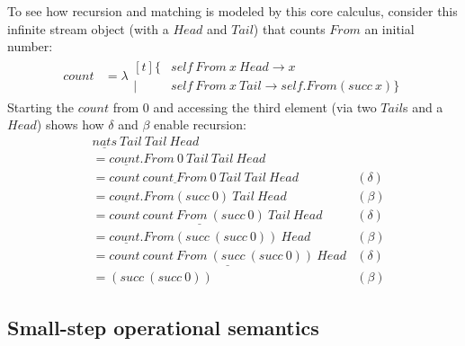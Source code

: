 \documentclass[sigplan,screen]{acmart}
\begin{document}
\begin{example}
\label{ex:count}
  
To see how recursion and matching is modeled by this core calculus, consider
this infinite stream object (with a $\mathit{Head}$ and $\mathit{Tail}$) that
counts $\mathit{From}$ an initial number:
\begin{align*}
  \mathit{count} &=
  \lambda
  \begin{aligned}[t]
    \{&
    \mathit{self}~\mathit{From}~x~\mathit{Head} \to x
    \\
    \mid&
    \mathit{self}~\mathit{From}~x~\mathit{Tail} \to \mathit{self}.\mathit{From}(\mathit{succ}~x)
    \}
  \end{aligned}
\end{align*}
Starting the $\mathit{count}$ from 0 and accessing the third element (via two
$\mathit{Tail}$s and a $\mathit{Head}$) shows how $\delta$ and $\beta$ enable
recursion:
\begin{align*}
  &
  \underline{\mathit{nats}}~\mathit{Tail}~\mathit{Tail}~\mathit{Head}
  \\
  &=
  \underline{\mathit{count}.}\mathit{From}~0~\mathit{Tail}~\mathit{Tail}~\mathit{Head}
  \\
  &=
  \underline{
    \mathit{count}~\mathit{count}~\mathit{From}~0~\mathit{Tail}
  }
  ~\mathit{Tail}~\mathit{Head}
  &(\delta)
  \\
  &=
  \underline{\mathit{count}.}\mathit{From}(\mathit{succ}~0)~\mathit{Tail}~\mathit{Head}
  &(\beta)
  \\
  &=
  \underline{
    \mathit{count}~\mathit{count}~\mathit{From}~(\mathit{succ}~0)~\mathit{Tail}
  }
  ~\mathit{Head}
  &(\delta)
  \\
  &=
  \underline{\mathit{count}.}\mathit{From}(\mathit{succ}~(\mathit{succ}~0))~\mathit{Head}
  &(\beta)
  \\
  &=
  \underline{
    \mathit{count}~\mathit{count}
    ~\mathit{From}~(\mathit{succ}~(\mathit{succ}~0))
    ~\mathit{Head}
  }
  &(\delta)
  \\
  &=
  (\mathit{succ}~(\mathit{succ}~0))
  &(\beta)
\end{align*}
\end{example}

\subsection{Small-step operational semantics}
\end{document}

